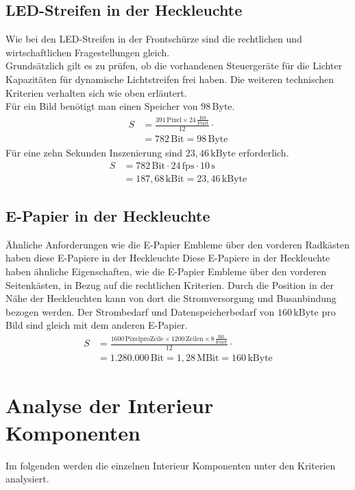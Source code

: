 \subsection{LED-Streifen in der Heckleuchte}
Wie bei den LED-Streifen in der Frontschürze sind die rechtlichen und wirtschaftlichen Fragestellungen gleich. \\
Grundsätzlich gilt es zu prüfen, ob die vorhandenen Steuergeräte für die Lichter Kapazitäten für dynamische Lichtstreifen frei haben.
Die weiteren technischen Kriterien verhalten sich wie oben erläutert. \\
Für ein Bild benötigt man einen Speicher von $ 98\,\mathrm{Byte} $.
\begin{align}
	S &= \frac{391\,\mathrm{Pixel} \times 24\,\frac{\mathrm{Bit}}{\mathrm{Pixel}}}{12} \cdot \\
	&= 782\,\mathrm{Bit} = 98\,\mathrm{Byte}
\end{align}
Für eine zehn Sekunden Inszenierung sind $ 23,46\,\mathrm{kByte} $ erforderlich.
\begin{align}
	S &= 782\,\mathrm{Bit} \cdot 24\,\mathrm{fps} \cdot 10\,\mathrm{s}\\
	&= 187,68\,\mathrm{kBit} = 23,46\,\mathrm{kByte}
\end{align}
\subsection{E-Papier in der Heckleuchte}
Ähnliche Anforderungen wie die E-Papier Embleme über den vorderen Radkästen haben diese E-Papiere in der Heckleuchte
Diese E-Papiere in der Heckleuchte haben ähnliche Eigenschaften, wie die E-Papier Embleme über den vorderen Seitenkästen, in Bezug auf die rechtlichen Kriterien. Durch die Position in der Nähe der Heckleuchten kann von dort die Stromversorgung und Busanbindung bezogen werden. Der Strombedarf und Datenspeicherbedarf von $ 160\,\mathrm{kByte} $ pro Bild sind gleich mit dem anderen E-Papier. 
\begin{align}
	S &= \frac{1600\,\mathrm{Pixel pro Zeile} \times 1200\,\mathrm{Zeilen} \times 8\,\frac{\mathrm{Bit}}{\mathrm{Pixel}}}{12} \cdot \\
	&= 1.280.000\,\mathrm{Bit} = 1,28\,\mathrm{MBit} = 160\,\mathrm{kByte}
\end{align}
\section{Analyse der Interieur Komponenten}
Im folgenden werden die einzelnen Interieur Komponenten unter den Kriterien analysiert.
